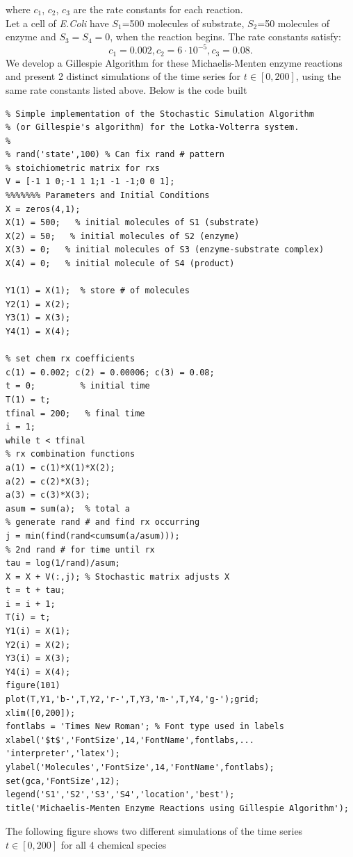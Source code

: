 where $c_{1}$, $c_{2}$, $c_{3}$ are the rate constants for each reaction.\\
Let a cell of \textit{E.Coli} have $S_{1}$=500 molecules of substrate, $S_{2}$=50 molecules of enzyme and $S_{3}=S_{4}=0$, when the reaction begins. The rate constants satisfy:
$$
c_{1} = 0.002, c_{2} = 6 \cdot 10^{-5}, c_{3} = 0.08.
$$
We develop a Gillespie Algorithm for these Michaelis-Menten enzyme reactions and present 2 distinct simulations of the time series for $t \in [0,200]$, using the same rate constants listed above. Below is the code built \newpage
\begin{lstlisting}[style=A]
% LV_gill.M
% Simple implementation of the Stochastic Simulation Algorithm
% (or Gillespie's algorithm) for the Lotka-Volterra system.
%
% rand('state',100) % Can fix rand # pattern
% stoichiometric matrix for rxs
V = [-1 1 0;-1 1 1;1 -1 -1;0 0 1];
%%%%%%% Parameters and Initial Conditions
X = zeros(4,1);
X(1) = 500;   % initial molecules of S1 (substrate)
X(2) = 50;   % initial molecules of S2 (enzyme)
X(3) = 0;   % initial molecules of S3 (enzyme-substrate complex)
X(4) = 0;   % initial molecule of S4 (product)

Y1(1) = X(1);  % store # of molecules
Y2(1) = X(2);
Y3(1) = X(3);
Y4(1) = X(4);

% set chem rx coefficients
c(1) = 0.002; c(2) = 0.00006; c(3) = 0.08;
t = 0;         % initial time
T(1) = t;
tfinal = 200;   % final time
i = 1;
while t < tfinal
% rx combination functions
a(1) = c(1)*X(1)*X(2);
a(2) = c(2)*X(3);
a(3) = c(3)*X(3);
asum = sum(a);  % total a
% generate rand # and find rx occurring
j = min(find(rand<cumsum(a/asum)));
% 2nd rand # for time until rx
tau = log(1/rand)/asum;
X = X + V(:,j); % Stochastic matrix adjusts X
t = t + tau;
i = i + 1;
T(i) = t;
Y1(i) = X(1);
Y2(i) = X(2);
Y3(i) = X(3);
Y4(i) = X(4);
figure(101)
plot(T,Y1,'b-',T,Y2,'r-',T,Y3,'m-',T,Y4,'g-');grid;
xlim([0,200]);
fontlabs = 'Times New Roman'; % Font type used in labels
xlabel('$t$','FontSize',14,'FontName',fontlabs,...
'interpreter','latex');  
ylabel('Molecules','FontSize',14,'FontName',fontlabs);  
set(gca,'FontSize',12);
legend('S1','S2','S3','S4','location','best');
title('Michaelis-Menten Enzyme Reactions using Gillespie Algorithm');
\end{lstlisting}


The following figure shows two different simulations of the time series $t \in [0,200]$ for all 4 chemical species

